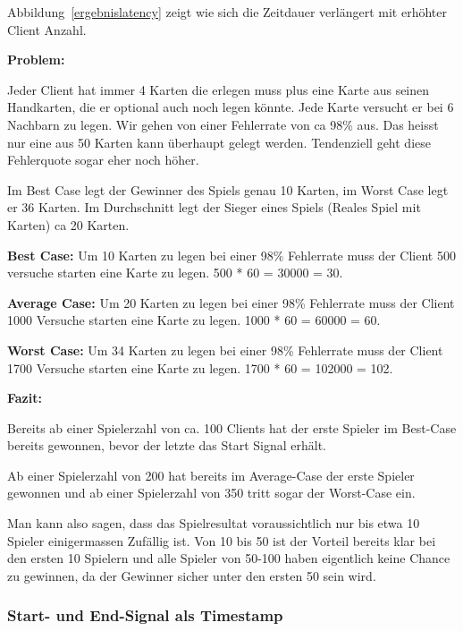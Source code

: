 Abbildung~\ref{ergebnislatency} zeigt wie sich die Zeitdauer verlängert mit erhöhter Client Anzahl.
 
\textbf{Problem:}

Jeder Client hat immer 4 Karten die erlegen muss plus eine Karte aus seinen Handkarten, die er optional auch noch legen könnte. Jede Karte versucht er bei 6 Nachbarn zu legen. Wir gehen von einer Fehlerrate von ca 98\% aus. Das heisst nur eine aus 50 Karten kann überhaupt gelegt werden. Tendenziell geht diese Fehlerquote sogar eher noch höher.

Im Best Case legt der Gewinner des Spiels genau 10 Karten, im Worst Case legt er 36 Karten.
Im Durchschnitt legt der Sieger eines Spiels (Reales Spiel mit Karten) ca 20 Karten. 

\textbf{Best Case:} Um 10 Karten zu legen bei einer 98\% Fehlerrate muss der Client 500 versuche starten eine Karte zu legen. \unit{500} * \unit{60}{\micro\second} = \unit{30000}{\micro\second} = \unit{30}{\milli\second}.

\textbf{Average Case:} Um 20 Karten zu legen bei einer 98\% Fehlerrate muss der Client 1000 Versuche starten eine Karte zu legen. \unit{1000} * \unit{60}{\micro\second} = \unit{60000}{\micro\second} = \unit{60}{\milli\second}.

\textbf{Worst Case:} Um 34 Karten zu legen bei einer 98\% Fehlerrate muss der Client 1700 Versuche starten eine Karte zu legen. \unit{1700} * \unit{60}{\micro\second} = \unit{102000}{\micro\second} = \unit{102}{\milli\second}.

\textbf{Fazit:}

Bereits ab einer Spielerzahl von ca. 100 Clients hat der erste Spieler im Best-Case bereits gewonnen, bevor der letzte das Start Signal erhält.

Ab einer Spielerzahl von 200 hat bereits im Average-Case der erste Spieler gewonnen  und ab einer Spielerzahl von 350 tritt sogar der Worst-Case ein.

Man kann also sagen, dass das Spielresultat voraussichtlich nur bis etwa 10 Spieler einigermassen Zufällig ist. Von 10 bis 50 ist der Vorteil bereits klar bei den ersten 10 Spielern und alle Spieler von 50-100 haben eigentlich keine Chance zu gewinnen, da der Gewinner sicher unter den ersten 50 sein wird. 

\subsubsection{Start- und End-Signal als Timestamp}

